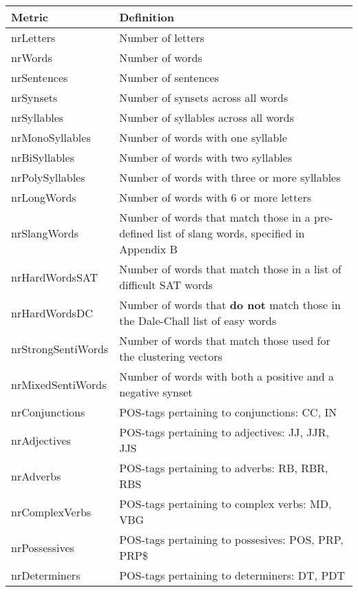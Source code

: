 \begin{tabular}{|l|p{90mm}|} \hline
\textbf{Metric} & \textbf{Definition} \\ \hline
nrLetters & Number of letters \\ \hline
nrWords & Number of words \\ \hline
nrSentences & Number of sentences \\ \hline
nrSynsets & Number of synsets across all words \\ \hline
nrSyllables & Number of syllables across all words \\ \hline
nrMonoSyllables & Number of words with one syllable \\ \hline
nrBiSyllables & Number of words with two syllables \\ \hline
nrPolySyllables & Number of words with three or more syllables \\ \hline
nrLongWords & Number of words with 6 or more letters \\ \hline
nrSlangWords & Number of words that match those in a pre-defined list of slang words, specified in Appendix B \\ \hline
nrHardWordsSAT & Number of words that match those in a list of difficult SAT words \cite{ref13} \\ \hline
nrHardWordsDC & Number of words that \textbf{do not} match those in the Dale-Chall list of easy words \\ \hline
nrStrongSentiWords & Number of words that match those used for the clustering vectors \\ \hline
nrMixedSentiWords & Number of words with both a positive and a negative synset \\ \hline
nrConjunctions & POS-tags pertaining to conjunctions: CC, IN \\ \hline
nrAdjectives & POS-tags pertaining to adjectives: JJ, JJR, JJS \\ \hline
nrAdverbs & POS-tags pertaining to adverbs: RB, RBR, RBS \\ \hline
nrComplexVerbs & POS-tags pertaining to complex verbs: MD, VBG \\ \hline
nrPossessives & POS-tags pertaining to possesives: POS, PRP, PRP\$ \\ \hline
nrDeterminers & POS-tags pertaining to determiners: DT, PDT \\ \hline
\end{tabular}